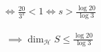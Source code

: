 \begin{solution}
\begin{enumerate}[label = \arabic*.]
    \begin{align*}
        \iff
        \frac{20}{3^s} < 1
        \iff
        s > \frac{\log{20}}{\log 3}
    \end{align*}

    \begin{align*}
        \implies
        \dim_\mathcal{H} S \leq \frac{\log{20}}{\log 3}
    \end{align*}

\end{enumerate}

\end{solution}


